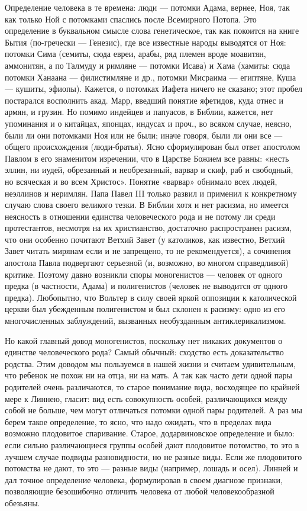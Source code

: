 Определение человека  в те  времена: люди  --- потомки  Адама, вернее,
Ноя, так как только Ной  с потомками спаслись после Всемирного Потопа.
Это  определение  в  буквальном  смысле слова  генетическое,  так  как
покоится на книге  Бытия (по-гречески --- Генезис),  где все известные
народы выводятся от Ноя: потомки  Сима (семиты, сюда евреи, арабы, ряд
племен вроде моавитян,  аммонитян, а по Талмуду и  римляне --- потомки
Исава) и  Хама (хамиты: сюда  потомки Ханаана --- филистимляне  и др.,
потомки Мисраима  --- египтяне, Куша  --- кушиты, эфиопы).  Кажется, о
потомках Иафета ничего не сказано; этот пробел
постарался восполнить акад. Марр, введший понятие яфетидов, куда отнес
и армян, и  грузин. Но помимо индейцев и папуасов,  в Библии, кажется,
нет  упоминания и  о китайцах,  японцах,  индусах и  проч., во  всяком
случае,  неясно,  были  ли  они  потомками  Ноя  или  не  были;  иначе
говоря, были  ли они  все —  общего происхождения  (люди-братья). Ясно
сформулирован был  ответ апостолом Павлом в  его знаменитом изречении,
что в Царстве  Божием все равны: «несть эллин, ни  иудей, обрезанный и
необрезанный, варвар и  скиф, раб и свободный, но всяческая  и во всем
Христос». Понятие «варвар» обнимало  всех людей, неэллинов и неримлян.
Папа Павел  III только  развил и применил  к конкретному  случаю слова
своего  великого  тезки. В  Библии  хотя  и  нет расизма,  но  имеется
неясность в отношении единства человеческого рода и не потому ли среди
протестантов,  несмотря на  их христианство,  достаточно распространен
расизм,  что они  особенно  почитают Ветхий  Завет  (у католиков,  как
известно,  Ветхий Завет  читать мирянам  если  и не  запрещено, то  не
рекомендуется), а  сочинения апостола  Павла подвергают  серьезной (и,
возможно,  во многом  справедливой)  критике.  Поэтому давно  возникли
споры моногенистов —  человек от одного предка (в  частности, Адама) и
полигенистов  (человек  не  выводится от  одного  предка).  Любопытно,
что  Вольтер  в  силу  своей яркой  оппозиции  к  католической  церкви
был  убежденным полигенистом  и был  склонен  к расизму:  одно из  его
многочисленных заблуждений, вызванных необузданным антиклерикализмом.

Но какой главный довод моногенистов, поскольку нет никаких документов о единстве человеческого рода? Самый обычный: сходство есть доказательство родства. Этим доводом мы пользуемся в нашей жизни и считаем удивительным, что ребенок не похож ни на отца, ни на мать. А так как часто дети одной пары родителей очень различаются, то старое понимание вида, восходящее по крайней мере к Линнею, гласит: вид есть совокупность особей, различающихся между собой не больше, чем могут отличаться потомки одной пары родителей. А раз мы берем такое определение, то ясно, что надо ожидать, что в пределах вида возможно плодовитое спаривание. Старое, додарвиновское определение и было: если сильно различающиеся группы особей дают плодовитое потомство, то это в лучшем случае подвиды разновидности, но не разные виды. Если же плодовитого потомства не дают, то это — разные виды (например, лошадь и осел). Линней и дал точное определение человека, формулировав в своем диагнозе признаки, позволяющие безошибочно отличить человека от любой человекообразной обезьяны.

